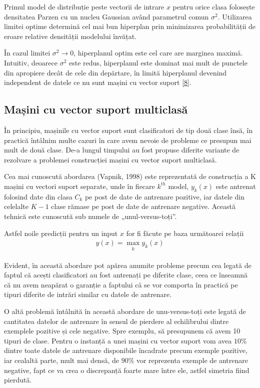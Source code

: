 Primul model de distribuție peste vectorii de intrare $x$ pentru orice clasa folosește densitatea Parzen cu un nucleu Gaussian având parametrul comun $\sigma^2$. Utilizarea limitei optime determină cel mai bun hiperplan prin minimizarea probabilității de eroare relative densității modelului învățat. 

În cazul limitei $\sigma^2 \rightarrow 0$, hiperplanul optim este cel care are marginea maximă. Intuitiv, deoarece $\sigma^2$ este redus, hiperplanul este dominat mai mult de punctele din apropiere decât de cele din depărtare, în limită hiperplanul devenind independent de datele ce nu sunt mașini cu vector suport \hyperlink{ChristopherBishop}{[8]}. 

\subsection{Mașini cu vector suport multiclasă}

În principiu, mașinile cu vector suport sunt clasificatori de tip două clase însă, în practică întâlnim multe cazuri în care avem nevoie de probleme ce presupun mai mult de două clase. De-a lungul timpului au fost propuse diferite variante de rezolvare a problemei construcției mașini cu vector suport multiclasă.

Cea mai cunoscută abordarea (Vapnik, 1998) este reprezentată de construcția a K mașini cu vectori suport separate, unde în fiecare $k^{th}$  model, $y_k(x)$ este antrenat folosind date din clasa $C_k$ pe post de date de antrenare pozitive, iar datele din celelalte $K-1$ clase rămase pe post de date de antrenare negative. Această tehnică este cunoscută sub numele de „unul-versus-toți”. 

Astfel noile predicții pentru un input $x$ for fi făcute pe baza următoarei relații
\begin{align}
	y(x) = \max_{\substack{k}}y_k(x)
\end{align}

Evident, în această abordare pot apărea anumite probleme precum cea legată de faptul că acești clasificatori au fost antrenați pe diferite clase, ceea ce înseamnă că nu avem neapărat o garanție a faptului că se vor comporta în practică pe tipuri diferite de intrări similar cu datele de antrenare.

O altă problemă întâlnită în această abordare de unu-versus-toți este legată de cantitatea datelor de antrenare în sensul de pierdere al echilibrului dintre exemplele pozitive și cele negative. Spre exemplu, să presupunem că avem 10 tipuri de clase. Pentru o instanță a unei mașini cu vector suport vom avea $10\%$ dintre toate datele de antrenare disponibile încadrate precum exemple pozitive, iar cealaltă parte, mult mai densă, de $90\%$ vor reprezenta exemple de antrenare negative, fapt ce va crea o discrepanță foarte mare între ele, astfel simetria fiind pierdută.

